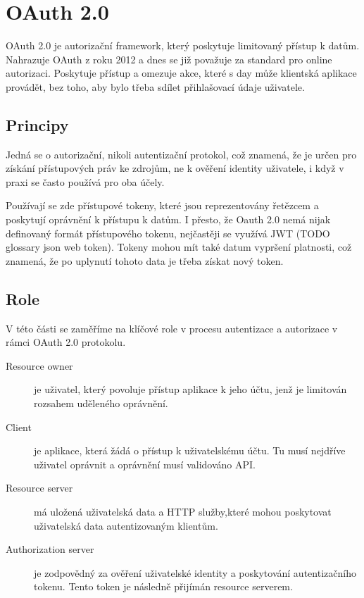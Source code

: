 \section{OAuth 2.0}
OAuth 2.0 je autorizační framework, který poskytuje limitovaný přístup k datům. Nahrazuje OAuth z roku 2012 a dnes se již považuje za standard pro online autorizaci. Poskytuje přístup a omezuje akce, které s day může klientská aplikace provádět, bez toho, aby bylo třeba sdílet přihlašovací údaje uživatele.


\subsection{Principy}
Jedná se o autorizační, nikoli autentizační protokol, což znamená, že je určen pro získání přístupových práv ke zdrojům, ne k ověření identity uživatele, i když v praxi se často používá pro oba účely.

Používají se zde přístupové tokeny, které jsou reprezentovány řetězcem a poskytují oprávnění k přístupu k datům. I přesto, že Oauth 2.0 nemá nijak definovaný formát přístupového tokenu, nejčastěji se využívá JWT (TODO glossary json web token). Tokeny mohou mít také datum vypršení platnosti, což znamená, že po uplynutí tohoto data je třeba získat nový token.


\subsection{Role}\label{sec:Oauth_roles}
V této části se zaměříme na klíčové role v procesu autentizace a autorizace v rámci OAuth 2.0 protokolu.

\begin{description}
    \item[Resource owner] je uživatel, který povoluje přístup aplikace k jeho účtu, jenž je limitován rozsahem uděleného oprávnění.
    \item[Client] je aplikace, která žádá o přístup k uživatelskému účtu. Tu musí nejdříve uživatel oprávnit a oprávnění musí validováno API.
    \item[Resource server] má uložená uživatelská data a HTTP služby,které mohou poskytovat uživatelská data autentizovaným klientům.
    \item[Authorization server] je zodpovědný za ověření uživatelské identity a poskytování autentizačního tokenu. Tento token je následně přijímán resource serverem.
\end{description}

